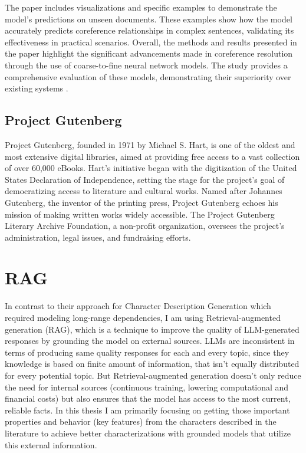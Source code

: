 The paper includes visualizations and specific examples to demonstrate the model’s predictions on unseen documents. These examples show how the model accurately predicts coreference relationships in complex sentences, validating its effectiveness in practical scenarios.
Overall, the methods and results presented in the paper highlight the significant advancements made in coreference resolution through the use of coarse-to-fine neural network models. The study provides a comprehensive evaluation of these models, demonstrating their superiority over existing systems .

\subsection{Project Gutenberg}
Project Gutenberg, founded in 1971 by Michael S. Hart, is one of the oldest and most extensive digital libraries, aimed at providing free access to a vast collection of over 60,000 eBooks. Hart's initiative began with the digitization of the United States Declaration of Independence, setting the stage for the project's goal of democratizing access to literature and cultural works. Named after Johannes Gutenberg, the inventor of the printing press, Project Gutenberg echoes his mission of making written works widely accessible. The Project Gutenberg Literary Archive Foundation, a non-profit organization, oversees the project's administration, legal issues, and fundraising efforts.

\section{RAG}
In contrast to their approach for Character Description Generation which required modeling long-range dependencies, I am using Retrieval-augmented generation (RAG), which is a technique to improve the quality of LLM-generated responses by grounding the model on external sources. LLMs are inconsistent in terms of producing same quality responses for each and every topic, since they knowledge is based on finite amount of information, that isn't equally distributed for every potential topic. But Retrieval-augmented generation doesn't only reduce the need for internal sources (continuous training, lowering computational and financial costs) but also ensures that the model has access to the most current, reliable facts.
In this thesis I am primarily focusing on getting those important properties and behavior (key features) from the characters described in the literature to achieve better characterizations with grounded models that utilize this external information.


